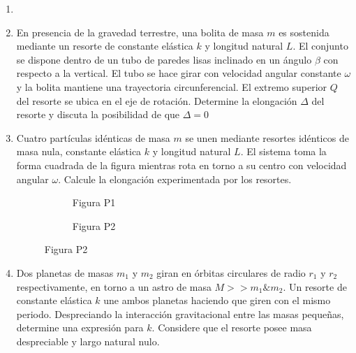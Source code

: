\documentclass[letterpaper,11pt]{article}
\begin{document}
\vspace{-1cm}
\begin{enumerate}\setlength{\itemsep}{0.4cm}


\item[]

\item En presencia de la gravedad terrestre, una bolita de masa $m$ es sostenida mediante un resorte de constante elástica $k$ y longitud natural $L$. El conjunto se dispone dentro de un tubo de paredes lisas inclinado en un ángulo $\beta$ con respecto a la vertical. El tubo se hace girar con velocidad angular constante $\omega$ y la bolita mantiene una trayectoria circunferencial. El extremo superior $Q$ del resorte se ubica en el eje de rotación. Determine la elongación $\Delta$ del resorte y discuta la posibilidad de que $\Delta = 0$

\item Cuatro partículas idénticas de masa $m$ se unen mediante resortes idénticos de masa nula, constante elástica $k$ y longitud natural $L$. El sistema toma la forma cuadrada de la figura mientras rota en torno a su centro con velocidad angular $\omega$. Calcule la elongación experimentada por los resortes.

\begin{figure}[H]
    \centering
    \begin{subfigure}[t]{0.45\textwidth}
        \centering
        
        \caption*{Figura P1}
    \end{subfigure}
    \hspace{0.1em}
    \begin{subfigure}[t]{0.45\textwidth}
        \centering
        
        \caption*{Figura P2}
    \end{subfigure}
\end{figure}


\item Dos planetas de masas $m_1$ y $m_2$ giran en órbitas circulares de radio $r_1$ y $r_2$ respectivamente, en torno a un astro de masa $M >> m_1 \& m_2$. Un resorte de constante elástica $k$ une ambos planetas haciendo que giren con el mismo periodo. Despreciando la interacción gravitacional entre las masas pequeñas, determine una expresión para $k$. Considere que el resorte posee masa despreciable y largo natural nulo.


\end{enumerate}
\end{document}
